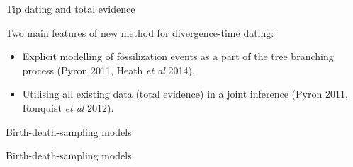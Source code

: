 

\begin{frame}{Tip dating and total evidence}

Two main features of new method for divergence-time dating:
\begin{itemize}
\item Explicit modelling of fossilization events as a part of the tree branching process (Pyron 2011, Heath {\it et al} 2014),
\item Utilising all existing data \textcolor{newblue1}{(total evidence)} in a joint inference (Pyron 2011, Ronquist {\it et al} 2012).
\end{itemize}

\end{frame}








 



\begin{frame}{Birth-death-sampling models}

\begin{figure}
  \begin{center}
               
            \end{center}
            
         \end{figure}    
\end{frame}




\begin{frame}{Birth-death-sampling models}


 \begin{figure}
            \begin{center}
               
            \end{center}
            
         \end{figure}
    
\end{frame}



